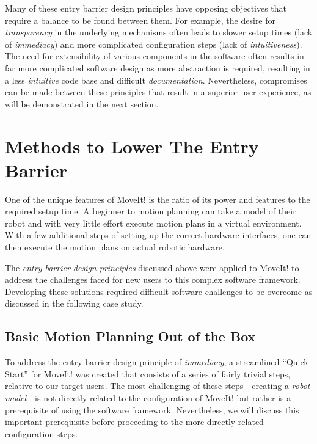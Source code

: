 \documentclass[10pt,journal,compsoc]{joser1}
\begin{document}
{Many of these entry barrier design principles have opposing objectives that require a balance to be
found between them. For example, the desire for \textit{transparency} in the
underlying mechanisms often leads to slower setup times (lack of
\textit{immediacy}) and more complicated configuration steps (lack of
\textit{intuitiveness}). The need for extensibility of various components in the
software often results in far more complicated software design as more
abstraction is required, resulting in a less \textit{intuitive} code base and
difficult \textit{documentation}. Nevertheless, compromises can be made between
these principles that result in a superior user experience, as will be
demonstrated in the next section.

\section{Methods to Lower The Entry Barrier}
\label{sec::lowering_barriers}

One of the unique features of MoveIt! is the ratio of its power and features to
the required setup time. A beginner to motion planning can take a model of their
robot and with very little effort execute motion plans in a virtual environment.
With a few additional steps of setting up the correct hardware interfaces, one
can then execute the motion plans on actual robotic hardware.

The \textit{entry barrier design principles} discussed above were applied to
MoveIt! to address the challenges faced for new users to this complex software
framework. Developing these solutions required difficult software challenges to
be overcome as discussed in the following case study.

\subsection{Basic Motion Planning Out of the Box}

To address the entry barrier design principle of \textit{immediacy}, a
streamlined ``Quick Start'' for MoveIt! was created that consists of a series of
fairly trivial steps, relative to our target users. The most challenging of
these steps---creating a \textit{robot model}---is not directly related to the
configuration of MoveIt! but rather is a prerequisite of using the software
framework. Nevertheless, we will discuss this important prerequisite before
proceeding to the more directly-related configuration steps.

}
\end{document}
